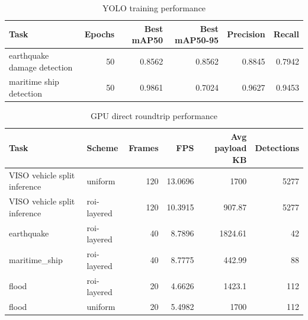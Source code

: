\begin{table}[htbp]
\centering
\caption{YOLO training performance}
\begin{tabular}{lrrrrr}
\toprule
Task & Epochs & Best mAP50 & Best mAP50-95 & Precision & Recall \\
\midrule
earthquake damage detection & 50 & 0.8562 & 0.8562 & 0.8845 & 0.7942 \\
maritime ship detection & 50 & 0.9861 & 0.7024 & 0.9627 & 0.9453 \\
\bottomrule
\end{tabular}
\end{table}

\begin{table}[htbp]
\centering
\caption{GPU direct roundtrip performance}
\begin{tabular}{llrrrr}
\toprule
Task & Scheme & Frames & FPS & Avg payload KB & Detections \\
\midrule
VISO vehicle split inference & uniform & 120 & 13.0696 & 1700 & 5277 \\
VISO vehicle split inference & roi-layered & 120 & 10.3915 & 907.87 & 5277 \\
earthquake & roi-layered & 40 & 8.7896 & 1824.61 & 42 \\
maritime_ship & roi-layered & 40 & 8.7775 & 442.99 & 88 \\
flood & roi-layered & 20 & 4.6626 & 1423.1 & 112 \\
flood & uniform & 20 & 5.4982 & 1700 & 112 \\
\bottomrule
\end{tabular}
\end{table}
